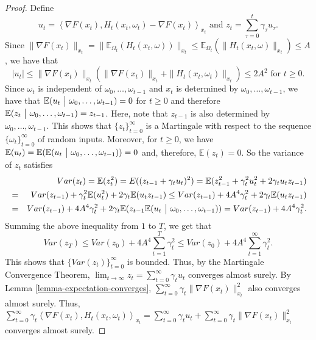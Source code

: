 \documentclass{amsart}
\newcommand{\E}{\mathbb{E}}
\newcommand{\g}{\gamma}
\theoremstyle{plain}
\theoremstyle{definition}
\theoremstyle{remark}
\numberwithin{theorem}{section}
\numberwithin{equation}{section}
\begin{document}
\begin{proof}
Define 
\begin{equation}\label{eq-lemma-F-x-t-converge-1}
u_t = \left\langle \nabla F(x_t), H_t(x_t,\omega_t) - \nabla F(x_t)\right\rangle_{x_t} \text{ and  } z_t = \sum_{\tau=0}^t \g_\tau u_\tau.
\end{equation} 
Since $\|\nabla F(x_t)\|_{x_t} = \|\E_{\Omega_t}(H_t(x_t,\omega))\|_{x_t} \leq \E_{\Omega_t}(\|H_t(x_t,\omega)\|_{x_t}) \leq A$, we have that 
\[
|u_t| \leq \|\nabla F(x_t)\|_{x_t} (\|\nabla F(x_t)\|_{x_t} + \|H_t(x_t,\omega_t)\|_{x_t}) \leq 2A^2 \text{ for } t\geq 0.
\]
Since $\omega_t$ is independent of $\omega_0,\dots, \omega_{t-1}$ and $x_t$ is determined by $\omega_0,\dots, \omega_{t-1}$, we have that $\E(u_t~\big{|}~\omega_0,\dots,\omega_{t-1}) = 0$ for $t \geq 0$ and therefore $\E(z_t~\big{|}~\omega_0,\dots,\omega_{t-1})=z_{t-1}$. Here, note that $z_{t-1}$ is also determined by $\omega_0,\dots,\omega_{t-1}$. This shows that $\{z_t\}_{t=0}^\infty$ is a Martingale with respect to the sequence $\{\omega_t\}_{t=0}^\infty$ of random inputs. Moreover, for $t\geq 0$, we have $\E(u_t) = \E(\E(u_t~\big{|}~\omega_0,\dots,\omega_{t-1}))=0$ and, therefore, $\E(z_t)=0$. So the variance of $z_t$ satisfies
\begin{eqnarray*}
&& Var(z_t)  =  \E(z_t^2) =E((z_{t-1}+\g_t u_t)^2) = \E(z_{t-1}^2 + \g_t^2 u_t^2 +  2\g_t u_t z_{t-1}) \\
& = &   Var(z_{t-1}) + \g_t^2\E(u_t^2) + 2 \g_t\E( u_t z_{t-1}) \leq  Var(z_{t-1}) + 4A^4\g_t^2 + 2\g_t \E(u_t z_{t-1}) \\
& = & Var(z_{t-1}) + 4A^4\g_t^2+ 2\g_t \E(z_{t-1}\E(u_t ~\big{|}~\omega_0,\dots,\omega_{t-1})) = Var(z_{t-1}) + 4A^4\g_t^2.
\end{eqnarray*}
Summing the above inequality from $1$ to $T$, we get that 
\[
Var(z_T) \leq Var(z_0) + 4A^4\sum_{t=1}^T \g_t^2 \leq Var(z_0) + 4A^4\sum_{t=1}^\infty \g_t^2.
\] 
This shows that $\{Var(z_t)\}_{t=0}^\infty$ is bounded. Thus, by the Martingale Convergence Theorem, $\lim_{t\rightarrow \infty}z_t =  \sum_{t=0}^\infty \g_t u_t$ converges almost surely. By Lemma \ref{lemma-expectation-converges}, $\sum_{t=0}^\infty \g_t \|\nabla F(x_t)\|_{x_t}^2$ also converges almost surely. Thus, $\sum_{t=0}^\infty \g_t \left\langle \nabla F(x_t), H_t(x_t,\omega_t)\right\rangle_{x_t} = \sum_{t=0}^\infty \g_t u_t + \sum_{t=0}^\infty \g_t \|\nabla F(x_t)\|_{x_t}^2$ converges almost surely.


\end{proof}
\end{document}
